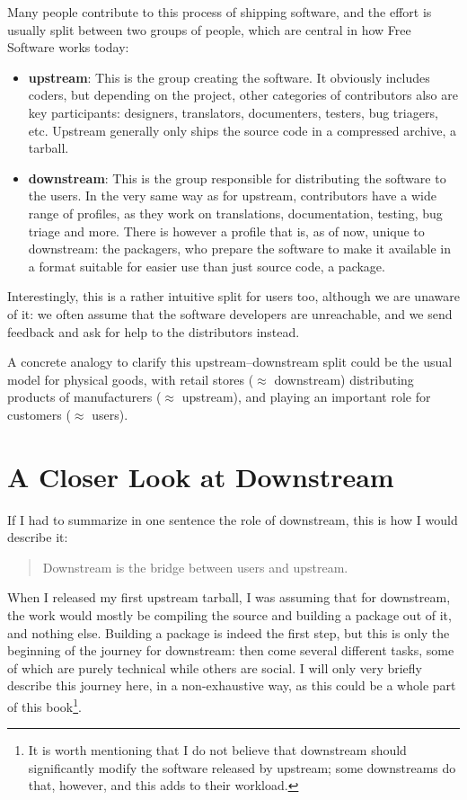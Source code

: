 Many people contribute to this process of shipping software, and the effort is
usually split between two groups of people, which are central in how Free
Software works today:

\begin{itemize}
\item \textbf{upstream}: This is the group creating the software. It obviously
includes coders, but depending on the project, other categories of contributors
also are key participants: designers, translators, documenters, testers, bug
triagers, etc. Upstream generally only ships the source code in a compressed
archive, a tarball.
\item \textbf{downstream}: This is the group responsible for distributing the
software to the users. In the very same way as for upstream, contributors have
a wide range of profiles, as they work on translations, documentation, testing,
bug triage and more. There is however a profile that is, as of now, unique to
downstream: the packagers, who prepare the software to make it available in a
format suitable for easier use than just source code, a package.
\end{itemize}

Interestingly, this is a rather intuitive split for users too, although we are
unaware of it: we often assume that the software developers are unreachable,
and we send feedback and ask for help to the distributors instead.

A concrete analogy to clarify this upstream--downstream split could be the
usual model for physical goods, with retail stores ($\approx$ downstream)
distributing products of manufacturers ($\approx$ upstream), and playing an
important role for customers ($\approx$ users).

\section*{A Closer Look at Downstream}

If I had to summarize in one sentence the role of downstream, this is how I
would describe it:
\begin{quote}
Downstream is the bridge between users and upstream.
\end{quote}

When I released my first upstream tarball, I was assuming that for downstream,
the work would mostly be compiling the source and building a package out of it,
and nothing else. Building a package is indeed the first step, but this is only
the beginning of the journey for downstream: then come several different tasks,
some of which are purely technical while others are social. I will only very
briefly describe this journey here, in a non-exhaustive way, as this could be a
whole part of this book\footnote{It is worth mentioning that I do not believe
that downstream should significantly modify the software released by upstream;
some downstreams do that, however, and this adds to their workload.}.

